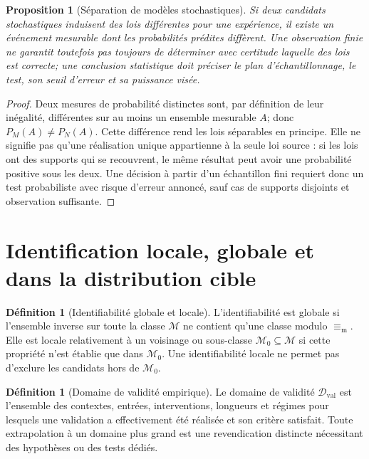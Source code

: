 \documentclass[11pt,oneside]{book}
\newtheorem{proposition}[theoreme]{Proposition}
\theoremstyle{definition}
\newtheorem{definition}[theoreme]{Définition}
\theoremstyle{remark}
\newcommand{\Mcal}{\mathcal M}
\newcommand{\1}{\mathbf 1}
\newcommand{\MechEq}{\equiv_{\mathrm m}}
\begin{document}
\begin{samepage}
\begin{proposition}[Séparation de modèles stochastiques]
Si deux candidats stochastiques induisent des lois différentes pour une expérience, il existe un événement mesurable dont les probabilités prédites diffèrent. Une observation finie ne garantit toutefois pas toujours de déterminer avec certitude laquelle des lois est correcte; une conclusion statistique doit préciser le plan d'échantillonnage, le test, son seuil d'erreur et sa puissance visée.
\end{proposition}
\begin{proof}
Deux mesures de probabilité distinctes sont, par définition de leur inégalité, différentes sur au moins un ensemble mesurable $A$; donc $P_M(A)\ne P_N(A)$. Cette différence rend les lois séparables en principe. Elle ne signifie pas qu'une réalisation unique appartienne à la seule loi source : si les lois ont des supports qui se recouvrent, le même résultat peut avoir une probabilité positive sous les deux. Une décision à partir d'un échantillon fini requiert donc un test probabiliste avec risque d'erreur annoncé, sauf cas de supports disjoints et observation suffisante.
\end{proof}
\end{samepage}

\section{Identification locale, globale et dans la distribution cible}
\begin{definition}[Identifiabilité globale et locale]
L'identifiabilité est globale si l'ensemble inverse sur toute la classe $\Mcal$ ne contient qu'une classe modulo $\MechEq$. Elle est locale relativement à un voisinage ou sous-classe $\Mcal_0\subseteq\Mcal$ si cette propriété n'est établie que dans $\Mcal_0$. Une identifiabilité locale ne permet pas d'exclure les candidats hors de $\Mcal_0$.
\end{definition}

\begin{definition}[Domaine de validité empirique]
Le domaine de validité $\mathcal D_{\mathrm{val}}$ est l'ensemble des contextes, entrées, interventions, longueurs et régimes pour lesquels une validation a effectivement été réalisée et son critère satisfait. Toute extrapolation à un domaine plus grand est une revendication distincte nécessitant des hypothèses ou des tests dédiés.
\end{definition}
\end{document}
